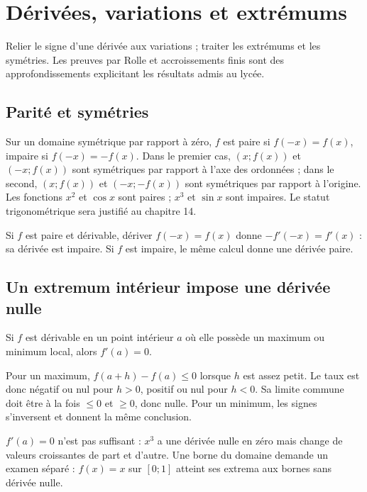\documentclass[../cours_1re.tex]{subfiles}
\begin{document}
\setcounter{chapter}{9}
\chapter{Dérivées, variations et extrémums}
\label{ch:10}
\begin{objectif}
Relier le signe d'une dérivée aux variations ; traiter les extrémums et les symétries. Les preuves par Rolle et accroissements finis sont des approfondissements explicitant les résultats admis au lycée.
\end{objectif}
\section{Parité et symétries}
Sur un domaine symétrique par rapport à zéro, $f$ est paire si $f(-x)=f(x)$, impaire si $f(-x)=-f(x)$.
Dans le premier cas, $(x;f(x))$ et $(-x;f(x))$ sont symétriques par rapport à l'axe des ordonnées ; dans le second, $(x;f(x))$ et $(-x;-f(x))$ sont symétriques par rapport à l'origine.
Les fonctions $x^2$ et $\cos x$ sont paires ; $x^3$ et $\sin x$ sont impaires. Le statut trigonométrique sera justifié au chapitre 14.
\begin{demonstration}[Complément]
Si $f$ est paire et dérivable, dériver $f(-x)=f(x)$ donne $-f'(-x)=f'(x)$ : sa dérivée est impaire. Si $f$ est impaire, le même calcul donne une dérivée paire.
\end{demonstration}
\section{Un extremum intérieur impose une dérivée nulle}
\begin{theoreme}
Si $f$ est dérivable en un point intérieur $a$ où elle possède un maximum ou minimum local, alors $f'(a)=0$.
\end{theoreme}
\begin{demonstration}
Pour un maximum, $f(a+h)-f(a)\le0$ lorsque $h$ est assez petit. Le taux est donc négatif ou nul pour $h>0$, positif ou nul pour $h<0$. Sa limite commune doit être à la fois $\le0$ et $\ge0$, donc nulle. Pour un minimum, les signes s'inversent et donnent la même conclusion.
\end{demonstration}
$f'(a)=0$ n'est pas suffisant : $x^3$ a une dérivée nulle en zéro mais change de valeurs croissantes de part et d'autre. Une borne du domaine demande un examen séparé : $f(x)=x$ sur $[0;1]$ atteint ses extrema aux bornes sans dérivée nulle.
\end{document}
